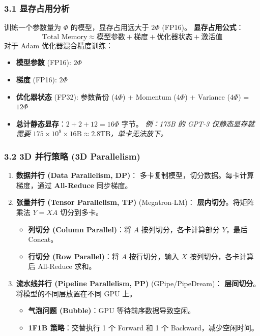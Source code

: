 \documentclass[a4paper, 11pt]{ctexart}
\begin{document}
\subsubsection{3.1 显存占用分析}
训练一个参数量为 $\Phi$ 的模型，显存占用远大于 $2\Phi$ (FP16)。
\textbf{显存占用公式}：
$$ \text{Total Memory} \approx \textbf{模型参数} + \textbf{梯度} + \textbf{优化器状态} + \textbf{激活值} $$
对于 Adam 优化器混合精度训练：
\begin{itemize}
    \item \textbf{模型参数} (FP16): $2\Phi$
    \item \textbf{梯度} (FP16): $2\Phi$
    \item \textbf{优化器状态} (FP32): 参数备份 ($4\Phi$) + Momentum ($4\Phi$) + Variance ($4\Phi$) = $12\Phi$
    \item \textbf{总计静态显存}：$2+2+12 = 16\Phi$ 字节。
    \textit{例：175B 的 GPT-3 仅静态显存就需要 $175 \times 10^9 \times 16 \text{B} \approx 2.8 \text{TB}$，单卡无法放下。}
\end{itemize}

\subsubsection{3.2 3D 并行策略 (3D Parallelism)}
\begin{enumerate}
    \item \textbf{数据并行 (Data Parallelism, DP)}：
    多卡复制模型，切分数据。每卡计算梯度，通过 \textbf{All-Reduce} 同步梯度。
    \item \textbf{张量并行 (Tensor Parallelism, TP)} (Megatron-LM)：
    \textbf{层内切分}。将矩阵乘法 $Y = XA$ 切分到多卡。
    \begin{itemize}
        \item \textbf{列切分 (Column Parallel)}：将 $A$ 按列切分，各卡计算部分 $Y$，最后 Concat。
        \item \textbf{行切分 (Row Parallel)}：将 $A$ 按行切分，输入 $X$ 按列切分，各卡计算后 All-Reduce 求和。
    \end{itemize}
    \item \textbf{流水线并行 (Pipeline Parallelism, PP)} (GPipe/PipeDream)：
    \textbf{层间切分}。将模型的不同层放置在不同 GPU 上。
    \begin{itemize}
        \item \textbf{气泡问题 (Bubble)}：GPU 等待前序数据导致空闲。
        \item \textbf{1F1B 策略}：交替执行 1 个 Forward 和 1 个 Backward，减少空闲时间。
    \end{itemize}
\end{enumerate}
\end{document}
